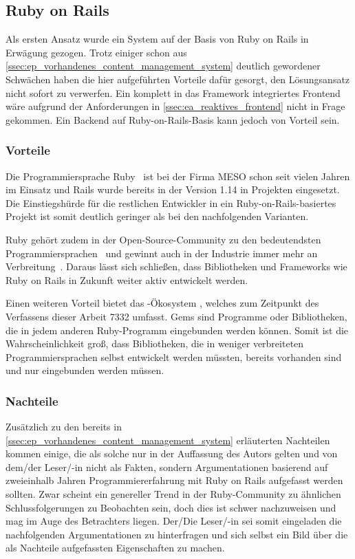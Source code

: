 \subsection{Ruby on Rails}
\label{ssec:kl_ruby_on_rails}

Als ersten Ansatz wurde ein System auf der Basis von Ruby on Rails in Erwägung
gezogen.  Trotz einiger schon aus
\cref{ssec:ep_vorhandenes_content_management_system} deutlich gewordener
Schwächen haben die hier aufgeführten Vorteile dafür gesorgt, den Lösungsansatz
nicht sofort zu verwerfen.  Ein komplett in das Framework integriertes Frontend
wäre aufgrund der Anforderungen in \cref{ssec:ea_reaktives_frontend} nicht in
Frage gekommen.  Ein Backend auf Ruby-on-Rails-Basis kann jedoch von Vorteil
sein.

\subsubsection{Vorteile}
\label{sssec:elr_vorteile}

Die Programmiersprache Ruby~\cite{ruby} ist bei der Firma MESO schon seit vielen
Jahren im Einsatz und Rails wurde bereits in der Version 1.14 in Projekten
eingesetzt.  Die Einstiegshürde für die restlichen Entwickler in ein
Ruby-on-Rails-basiertes Projekt ist somit deutlich geringer als bei den
nachfolgenden Varianten.

Ruby gehört zudem in der Open-Source-Community zu den bedeutendsten
Programmiersprachen~\cite{ghlangtrends} und gewinnt auch in der Industrie immer
mehr an Verbreitung~\cite{tiobe}.  Daraus lässt sich schließen, dass
Bibliotheken und Frameworks wie Ruby on Rails in Zukunft weiter aktiv entwickelt
werden.

Einen weiteren Vorteil bietet das -Ökosystem
\cite{rubygems}, welches zum Zeitpunkt des Verfassens dieser Arbeit 7332
 umfasst.  Gems sind Programme oder Bibliotheken, die in jedem
anderen Ruby-Programm eingebunden werden können.  Somit ist die
Wahrscheinlichkeit groß, dass Bibliotheken, die in weniger verbreiteten
Programmiersprachen selbst entwickelt werden müssten, bereits vorhanden sind und
nur eingebunden werden müssen.

\subsubsection{Nachteile}
\label{sssec:elr_nachteile}

Zusätzlich zu den bereits in
\cref{ssec:ep_vorhandenes_content_management_system} erläuterten Nachteilen
kommen einige, die als solche nur in der Auffassung des Autors gelten und von
dem/der Leser/-in nicht als Fakten, sondern Argumentationen basierend auf
zweieinhalb Jahren Programmiererfahrung mit Ruby on Rails aufgefasst werden
sollten.  Zwar scheint ein genereller Trend in der Ruby-Community zu ähnlichen
Schlussfolgerungen zu Beobachten sein, doch dies ist schwer nachzuweisen und mag
im Auge des Betrachters liegen.  Der/Die Leser/-in sei somit eingeladen die
nachfolgenden Argumentationen zu hinterfragen und sich selbst ein Bild über die
als Nachteile aufgefassten Eigenschaften zu machen.

